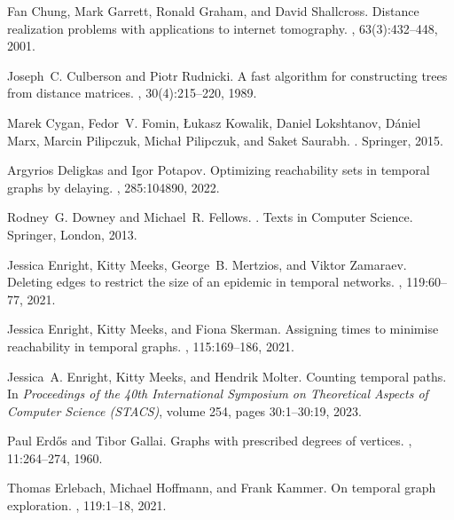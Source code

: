 \documentclass[a4paper,UKenglish,cleveref, autoref, thm-restate]{lipics-v2021}
\begin{document}
\begin{thebibliography}{10}
	Fan Chung, Mark Garrett, Ronald Graham, and David Shallcross.
	\newblock Distance realization problems with applications to internet
	tomography.
	, 63(3):432--448, 2001.
	
	Joseph~C. Culberson and Piotr Rudnicki.
	\newblock A fast algorithm for constructing trees from distance matrices.
	, 30(4):215--220, 1989.
	
	Marek Cygan, Fedor~V. Fomin, {\L{}}ukasz Kowalik, Daniel Lokshtanov,
	D{\'{a}}niel Marx, Marcin Pilipczuk, Micha\l{} Pilipczuk, and Saket Saurabh.
	.
	\newblock Springer, 2015.
	
	Argyrios Deligkas and Igor Potapov.
	\newblock Optimizing reachability sets in temporal graphs by delaying.
	, 285:104890, 2022.
	
	Rodney~G. Downey and Michael~R. Fellows.
	.
	\newblock Texts in Computer Science. Springer, London, 2013.
	
	Jessica Enright, Kitty Meeks, George~B. Mertzios, and Viktor Zamaraev.
	\newblock Deleting edges to restrict the size of an epidemic in temporal
	networks.
	, 119:60--77, 2021.
	
	Jessica Enright, Kitty Meeks, and Fiona Skerman.
	\newblock Assigning times to minimise reachability in temporal graphs.
	, 115:169--186, 2021.
	
	Jessica~A. Enright, Kitty Meeks, and Hendrik Molter.
	\newblock Counting temporal paths.
	\newblock In {\em Proceedings of the 40th International Symposium on
		Theoretical Aspects of Computer Science ({STACS})}, volume 254, pages
	30:1--30:19, 2023.
	
	Paul Erd{\H{o}}s and Tibor Gallai.
	\newblock Graphs with prescribed degrees of vertices.
	, 11:264--274, 1960.
	
	Thomas Erlebach, Michael Hoffmann, and Frank Kammer.
	\newblock On temporal graph exploration.
	, 119:1--18, 2021.
	

\end{thebibliography}
\end{document}
